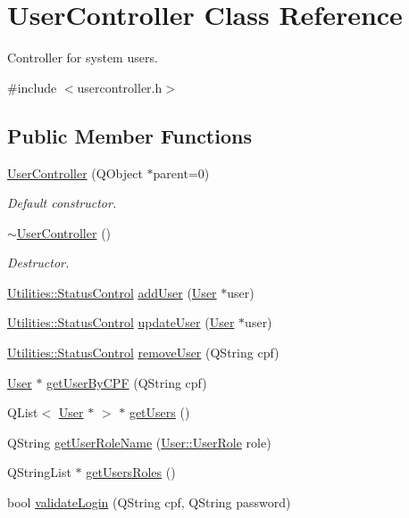 \hypertarget{class_user_controller}{\section{\-User\-Controller \-Class \-Reference}
\label{class_user_controller}
}


\-Controller for system users.  




{\ttfamily \#include $<$usercontroller.\-h$>$}

\subsection*{\-Public \-Member \-Functions}
\begin{DoxyCompactItemize}
\item 
\hyperlink{class_user_controller_aa7bdde30a4cfede2566b3bb96e83d353}{\-User\-Controller} (\-Q\-Object $\ast$parent=0)
\begin{DoxyCompactList}\small\item\em \-Default constructor. \end{DoxyCompactList}\item 
\hyperlink{class_user_controller_ad4e539d1ed1daf0d85f23cfdfdcfd77b}{$\sim$\-User\-Controller} ()
\begin{DoxyCompactList}\small\item\em \-Destructor. \end{DoxyCompactList}\item 
\hyperlink{class_utilities_a2974f062d85bdb0c444a1cbe554bf228}{\-Utilities\-::\-Status\-Control} \hyperlink{class_user_controller_aeab17c7a3946a903088926f3201db8a3}{add\-User} (\hyperlink{class_user}{\-User} $\ast$user)
\item 
\hyperlink{class_utilities_a2974f062d85bdb0c444a1cbe554bf228}{\-Utilities\-::\-Status\-Control} \hyperlink{class_user_controller_a1baa1a34a39160d0ff6e023c2d173343}{update\-User} (\hyperlink{class_user}{\-User} $\ast$user)
\item 
\hyperlink{class_utilities_a2974f062d85bdb0c444a1cbe554bf228}{\-Utilities\-::\-Status\-Control} \hyperlink{class_user_controller_a648915757f93f39b2a6c44a147830c2b}{remove\-User} (\-Q\-String cpf)
\item 
\hyperlink{class_user}{\-User} $\ast$ \hyperlink{class_user_controller_add2b9e205d994df7b03c8dafea468b53}{get\-User\-By\-C\-P\-F} (\-Q\-String cpf)
\item 
\-Q\-List$<$ \hyperlink{class_user}{\-User} $\ast$ $>$ $\ast$ \hyperlink{class_user_controller_aeb561ee6bafc3f106885d5d2384263d6}{get\-Users} ()
\item 
\-Q\-String \hyperlink{class_user_controller_a732365bc88fe2bb09d13b1e174967326}{get\-User\-Role\-Name} (\hyperlink{class_user_a43f49d6a3bf5f000aea476bc641949b0}{\-User\-::\-User\-Role} role)
\item 
\-Q\-String\-List $\ast$ \hyperlink{class_user_controller_a9888bcd5dfd425a761a5c8f8ef03d8f1}{get\-Users\-Roles} ()
\item 
bool \hyperlink{class_user_controller_adc2d4d5aa0c4da58ebb44f254560fe05}{validate\-Login} (\-Q\-String cpf, \-Q\-String password)
\end{DoxyCompactItemize}


